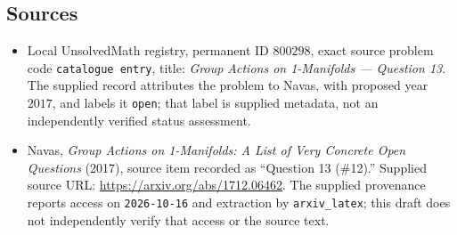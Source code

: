 \documentclass[11pt]{article}
\begin{document}
\subsection{Sources}
\begin{itemize}
\item Local UnsolvedMath registry, permanent ID \(800298\), exact source problem code \texttt{catalogue entry}, title: \emph{Group Actions on 1-Manifolds --- Question 13}. The supplied record attributes the problem to Navas, with proposed year \(2017\), and labels it \texttt{open}; that label is supplied metadata, not an independently verified status assessment.
\item Navas, \emph{Group Actions on 1-Manifolds: A List of Very Concrete Open Questions} (2017), source item recorded as ``Question 13 (\#12).'' Supplied source URL: \url{https://arxiv.org/abs/1712.06462}. The supplied provenance reports access on \texttt{2026-10-16} and extraction by \texttt{arxiv\_latex}; this draft does not independently verify that access or the source text.
\end{itemize}
\end{document}

